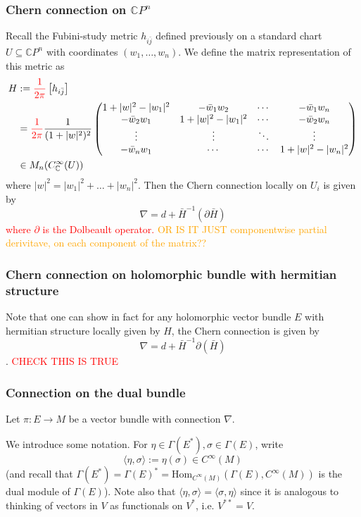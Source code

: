 \documentclass[a4paper]{article}
\theoremstyle{definition} \newtheorem*{definition}{Definition}
\theoremstyle{definition} \newtheorem*{definitions}{Definitions}
\theoremstyle{plain} \newtheorem{theorem}{Theorem}[section]
\theoremstyle{plain} \newtheorem{proposition}[theorem]{Proposition}
\theoremstyle{plain} \newtheorem{corollary}[theorem]{Corollary}
\theoremstyle{plain} \newtheorem{lemma}[theorem]{Lemma}
\theoremstyle{plain} \newtheorem{example}[theorem]{Example}
\newcommand{\checkCorrect}[1]{\textcolor{red}{#1}}
\newcommand{\understandBetter}[1]{\textcolor{orange}{#1}}
\newcommand{\complexnos}{\mathbb{C}}
\newcommand{\Hom}{\text{Hom}}
\newcommand{\smooth}{C^\infty}
\begin{document}
\subsubsection{Chern connection on $\complexnos P^n$}

Recall the Fubini-study metric $h_{i\bar{j}}$ defined previously on a standard chart $U\subseteq \complexnos P^n$ with coordinates $(w_1, \dots, w_n)$. We define the matrix representation of this metric as
\begin{align*}
H & := \checkCorrect{\frac{1}{2\pi}} \left[  h_{i\bar{j}} \right] \\
& = \checkCorrect{\frac{1}{2\pi}} \frac{1}{(1+|w|^2)^2}\begin{pmatrix}
1+|w|^2-|w_1|^2 & -\bar{w}_1w_2 & \cdots & -\bar{w}_1w_n \\
-\bar{w}_2w_1 & 1+|w|^2-|w_1|^2 & \cdots & -\bar{w}_2w_n \\
\vdots & \vdots & \ddots & \vdots \\
-\bar{w}_nw_1 & \cdots & \cdots & 1+|w|^2-|w_n|^2
\end{pmatrix} \\
& \in M_n(\smooth_\complexnos (U))
\end{align*}
where $|w|^2 = |w_1|^2 + \ldots + |w_n|^2$. 
Then the Chern connection locally on $U_i$ is given by 
$$\nabla = d + \bar{H}^{-1}(\partial \bar{H})$$
\checkCorrect{where $\partial$ is the Dolbeault operator. \understandBetter{OR IS IT JUST componentwise partial derivitave, on each component of the matrix??}}

\subsubsection{Chern connection on holomorphic bundle with hermitian structure}

Note that one can show in fact for any holomorphic vector bundle $E$ with hermitian structure locally given by $H$, the Chern connection is given by $$\nabla = d+\bar{H}^{-1}\partial(\bar{H})$$. \checkCorrect{CHECK THIS IS TRUE}

\subsubsection{Connection on the dual bundle}
Let $\pi:E\to M$ be a vector bundle with connection $\nabla$.

We introduce some notation. For $\eta\in \Gamma(E^*), \sigma\in \Gamma(E)$, write
$$\langle \eta, \sigma \rangle := \eta(\sigma)\in \smooth (M)$$
(and recall that $\Gamma(E^*)=\Gamma(E)^* = \Hom_{\smooth(M)}(\Gamma(E), \smooth(M))$ is the dual module of $\Gamma(E)$). Note also that $\langle \eta, \sigma \rangle = \langle \sigma, \eta \rangle $ since it is analogous to thinking of vectors in $V$ as functionals on $V^*$, i.e. $V^{**}=V$.
\end{document}
